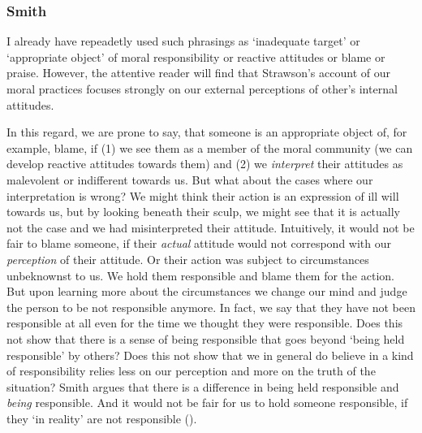 \documentclass{article}
\newcounter{example}
\begin{document}


\subsubsection{Smith}
\label{smith}

I already have repeadetly used such phrasings as `inadequate target' or
`appropriate object' of moral responsibility or reactive attitudes or blame or
praise. However, the attentive reader will find that Strawson's account of our
moral practices focuses strongly on our external perceptions of other's
internal attitudes.

In this regard, we are prone to say, that someone is an
appropriate object of, for example, blame, if (1) we see them as a member of the moral
community (we can develop reactive attitudes towards them) and (2) we
\textit{interpret} their attitudes as malevolent or indifferent towards us. But what
about the cases where our interpretation is wrong? We might think their action
is an expression of ill will towards us, but by looking beneath their sculp, we
might see that it is actually not the case and we had misinterpreted their
attitude. Intuitively, it would not be fair to blame someone, if their
\textit{actual}
attitude would not correspond with our \textit{perception} of their attitude.
Or their action was subject to circumstances unbeknownst to us. We hold them
responsible and blame them for the action. But upon learning more about the
circumstances we change our mind and judge the person to be not responsible
anymore. In fact, we say that they have not been responsible at all even for the
time we thought they were responsible. Does this not show that there is a sense
of being responsible that goes beyond `being held responsible' by others? Does
this not show that we in general do believe in a kind of responsibility relies
less on our perception and more on the truth of the situation? 
Smith argues that there is a difference in being held responsible and 
\textit{being} responsible. And it would not be fair for us to hold someone
responsible, if they `in reality' are not responsible (\cite[p.
472]{Smith_2007}).\\
\end{document}
